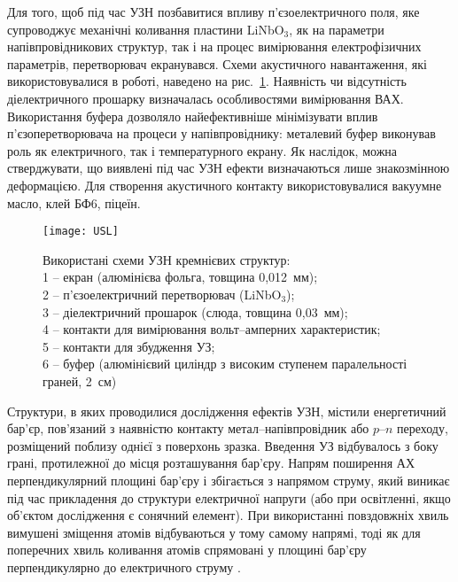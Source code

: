 Для того, щоб під час УЗН позбавитися впливу п'єзоелектричного поля, яке супроводжує механічні коливання пластини LiNbO$_3$,  як на параметри напівпровідникових структур, так і на процес вимірювання електрофізичних параметрів,
перетворювач екранувався.
Схеми акустичного навантаження, які використовувалися в роботі, наведено на рис.~\ref{figUSL}.
Наявність чи відсутність діелектричного прошарку визначалась особливостями вимірювання ВАХ.
Використання буфера дозволяло найефективніше мінімізувати вплив п'єзоперетворювача на процеси у напівпровіднику:
металевий буфер виконував роль як електричного, так і температурного екрану.
Як наслідок, можна стверджувати, що виявлені під час УЗН ефекти визначаються лише знакозмінною деформацією.
Для створення акустичного контакту використовувалися вакуумне масло, клей БФ6, піцеїн.

\begin{figure}
\center
\texttt{[image: USL]}%
\caption{\label{figUSL}
Використані схеми УЗН кремнієвих структур: \protect\\
1 --  екран (алюмінієва фольга, товщина 0,012~мм);\protect\\
2 -- п'єзоелектричний перетворювач (LiNbO$_3$);\protect\\
3 -- діелектричний прошарок (слюда, товщина 0,03~мм);\protect\\
4 -- контакти для вимірювання вольт--амперних характеристик;\protect\\
5 -- контакти для збудження УЗ;\protect\\
6 -- буфер (алюмінієвий циліндр з високим ступенем паралельності граней, 2~см)
}
\end{figure}



Структури, в яких проводилися дослідження ефектів УЗН, містили енергетичний бар'єр, пов'язаний з наявністю контакту метал--напівпровідник або $p$--$n$ переходу, розміщений поблизу однієї з поверхонь зразка.
Введення УЗ відбувалось з боку грані, протилежної до місця розташування бар'єру.
 Напрям поширення АХ перпендикулярний площині бар'єру і збігається з напрямом струму, який виникає під час прикладення до структури електричної напруги (або при освітленні, якщо об'єктом дослідження є сонячний елемент).
  При використанні повздовжніх хвиль вимушені зміщення атомів відбуваються у тому самому напрямі, тоді як для поперечних хвиль коливання атомів спрямовані у площині бар'єру перпендикулярно до електричного струму .


